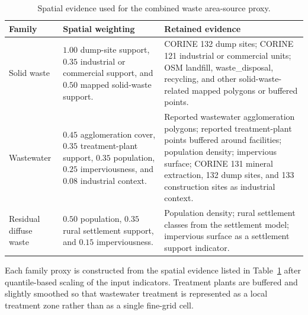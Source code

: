\begin{table}[htbp]
  \centering
  \caption{Spatial evidence used for the combined waste area-source proxy.}
  \label{tab:waste-spatial-rules}
  \scriptsize
  \begin{tabular}{p{} p{} p{}}
    \toprule
    Family & Spatial weighting & Retained evidence \\
    \midrule
    Solid waste &
    $1.00$ dump-site support, $0.35$ industrial or commercial support, and $0.50$ mapped solid-waste support. &
    CORINE 132 dump sites; CORINE 121 industrial or commercial units; OSM landfill, waste\_disposal, recycling, and other solid-waste-related mapped polygons or buffered points. \\
    Wastewater &
    $0.45$ agglomeration cover, $0.35$ treatment-plant support, $0.35$ population, $0.25$ imperviousness, and $0.08$ industrial context. &
    Reported wastewater agglomeration polygons; reported treatment-plant points buffered around facilities; population density; impervious surface; CORINE 131 mineral extraction, 132 dump sites, and 133 construction sites as industrial context. \\
    Residual diffuse waste &
    $0.50$ population, $0.35$ rural settlement support, and $0.15$ imperviousness. &
    Population density; rural settlement classes from the settlement model; impervious surface as a settlement support indicator. \\
    \bottomrule
  \end{tabular}
\end{table}

Each family proxy is constructed from the spatial evidence listed in
Table~\ref{tab:waste-spatial-rules} after quantile-based scaling of the
input indicators. Treatment plants are buffered and slightly smoothed so
that wastewater treatment is represented as a local treatment zone rather
than as a single fine-grid cell.

